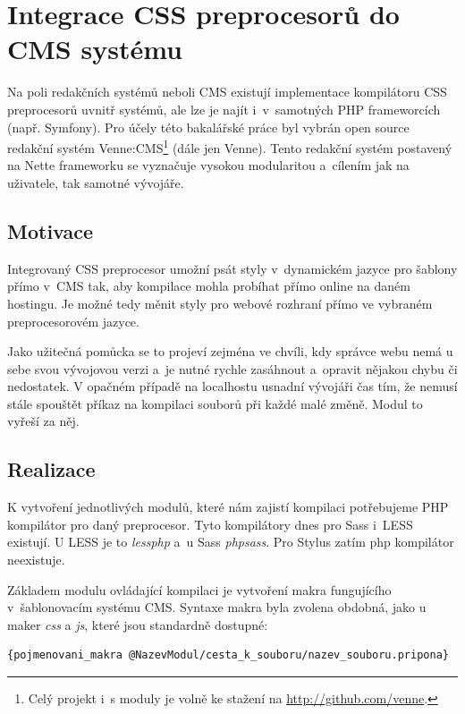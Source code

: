 \documentclass[thesis=B,czech]{FITthesis}[2012/06/26]
\begin{document}
\section{Integrace CSS preprocesorů do CMS systému}
\label{sec:cms}

Na poli redakčních systémů neboli \gls{CMS} existují implementace kompilátoru \gls{CSS} preprocesorů uvnitř systémů, ale lze je najít i~v~samotných \gls{PHP} frameworcích (např. Symfony). Pro účely této bakalářské práce byl vybrán open source redakční systém Venne:CMS\footnote{Celý projekt i~s moduly je volně ke stažení na \url{http://github.com/venne}.} (dále jen Venne). Tento redakční systém postavený na Nette frameworku se vyznačuje vysokou modularitou a~cílením jak na uživatele, tak samotné vývojáře.



\subsection{Motivace}

Integrovaný \gls{CSS} preprocesor umožní psát styly v~dynamickém jazyce pro šablony přímo v~\gls{CMS} tak, aby kompilace mohla probíhat přímo online na daném hostingu. Je možné tedy měnit styly pro webové rozhraní přímo ve vybraném preprocesorovém jazyce. 

Jako užitečná pomůcka se to projeví zejména ve chvíli, kdy správce webu nemá u sebe svou vývojovou verzi a~je nutné rychle zasáhnout a~opravit nějakou chybu či nedostatek. V opačném případě na localhostu usnadní vývojáři čas tím, že nemusí stále spouštět příkaz na kompilaci souborů při každé malé změně. Modul to vyřeší za něj. 



\subsection{Realizace}

K vytvoření jednotlivých modulů, které nám zajistí kompilaci potřebujeme \gls{PHP} kompilátor pro daný preprocesor. Tyto kompilátory dnes pro \gls{Sass} i~LESS existují. U LESS je to \textit{lessphp} a~u \gls{Sass} \textit{phpsass}. Pro Stylus zatím php kompilátor neexistuje.
 
Základem modulu ovládající kompilaci je vytvoření makra fungujícího v~šablonovacím systému \gls{CMS}. Syntaxe makra byla zvolena obdobná, jako u maker \textit{css} a \textit{js}, které jsou standardně dostupné:
\scriptsize
\begin{verbatim}
{pojmenovani_makra @NazevModul/cesta_k_souboru/nazev_souboru.pripona}
\end{verbatim}
\normalsize
\end{document}
